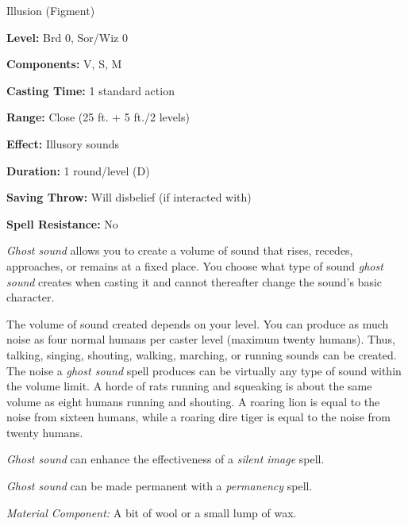 
Illusion (Figment)

\textbf{Level:} Brd 0, Sor/Wiz 0

\textbf{Components:} V, S, M

\textbf{Casting Time:} 1 standard action

\textbf{Range:} Close (25 ft. + 5 ft./2 levels)

\textbf{Effect:} Illusory sounds

\textbf{Duration:} 1 round/level (D)

\textbf{Saving Throw:} Will disbelief (if interacted with)

\textbf{Spell Resistance:} No

\textit{Ghost sound} allows you to create a volume of sound that rises, recedes, 
approaches, or remains at a fixed place. You choose what type of sound \textit{ghost 
sound} creates when casting it and cannot thereafter change the sound's basic character.

The volume of sound created depends on your level. You can produce as much noise 
as four normal humans per caster level (maximum twenty humans). Thus, talking, 
singing, shouting, walking, marching, or running sounds can be created. The noise 
a \textit{ghost sound} spell produces can be virtually any type of sound within 
the volume limit. A horde of rats running and squeaking is about the same volume 
as eight humans running and shouting. A roaring lion is equal to the noise from 
sixteen humans, while a roaring dire tiger is equal to the noise from twenty humans.

\textit{Ghost sound} can enhance the effectiveness of a \textit{silent image} spell.

\textit{Ghost sound} can be made permanent with a \textit{permanency} spell.

\textit{Material Component:} A bit of wool or a small lump of wax.

